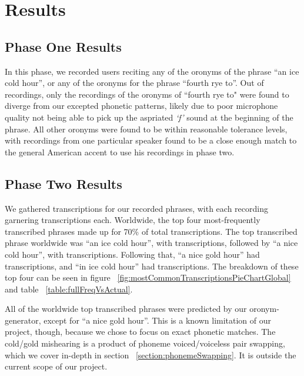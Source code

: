 \chapter{Results}
\label{results}

\section{Phase One Results}
\label{results:userStudyPhaseOne}

In this phase, we recorded \uniqueUsersPhaseOneUserStudy users reciting any of the \numOronymsPhaseOneUserStudy  oronyms of the phrase ``an ice cold hour'', or any of the \numForthRightOohOronymPhrases oronyms for the phrase ``fourth rye to''.  Out of \numResponsesPhaseOneUserStudy recordings, only the recordings of the oronyms of ``fourth rye to" were found to diverge from our excepted phonetic patterns, likely due to poor microphone quality not being able to pick up the aspriated \emph{`f'} sound at the beginning of the phrase\cite{elko_electronic_2007}. All other oronyms were found to be within reasonable tolerance levels, with \recordingsPhaseTwoUserStudy recordings from one particular speaker found to be a close enough match to the general American accent to use his recordings in phase two.


\section{Phase Two Results}
\label{results:userStudyPhaseTwo}


We gathered \numTotalTranscriptionsPhaseTwo transcriptions for our \recordingsPhaseTwoUserStudy recorded phrases, with each recording garnering \numTranscriptionsPerRecordingPhaseTwoUserStudy transcriptions each.  Worldwide, the top four most-frequently transcribed phrases made up for 70\% of total transcriptions.  The top transcribed phrase worldwide was ``an ice cold hour'', with \phaseTwoUserStudyTimesTranscribedAnIceColdHour transcriptions, followed by  ``a nice cold hour'', with \phaseTwoUserStudyTimesTranscribedANiceColdHour transcriptions.  Following that, ``a nice gold hour'' had \phaseTwoUserStudyTimesTranscribedANiceGoldHour transcriptions, and ``in ice cold hour'' had \phaseTwoUserStudyTimesTranscribedInIceColdHour transcriptions. The breakdown of these top four can be seen in figure ~\ref{fig:mostCommonTranscriptionsPieChartGlobal} and table ~\ref{table:fullFreqVsActual}. 

All of the worldwide top transcribed phrases were predicted by our oronym-generator, except for ``a nice gold hour''.  This is a known limitation of our project, though, because we chose to focus on exact phonetic matches.  The cold/gold mishearing is a product of phoneme voiced/voiceless pair swapping, which we cover in-depth in section ~\ref{section:phonemeSwapping}. It is outside the current scope of our project. 


